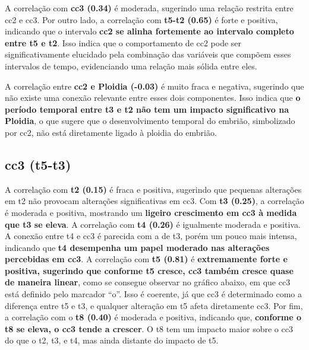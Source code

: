 A correlação com \textbf{cc3 (0.34)} é moderada, sugerindo uma relação restrita entre cc2 e cc3. Por outro lado, a correlação com \textbf{t5-t2 (0.65)} é forte e positiva, indicando que o intervalo \textbf{cc2 se alinha fortemente ao intervalo completo entre t5 e t2}. Isso indica que o comportamento de cc2 pode ser significativamente elucidado pela combinação das variáveis que compõem esses intervalos de tempo, evidenciando uma relação mais sólida entre eles.

A correlação entre \textbf{cc2 e Ploidia (-0.03)} é muito fraca e negativa, sugerindo que não existe uma conexão relevante entre esses dois componentes. Isso indica que \textbf{o período temporal entre t3 e t2 não tem um impacto significativo na Ploidia}, o que sugere que o desenvolvimento temporal do embrião, simbolizado por cc2, não está diretamente ligado à ploidia do embrião.

\subsection*{cc3 (t5-t3)}
A correlação com \textbf{t2 (0.15)} é fraca e positiva, sugerindo que pequenas alterações em t2 não provocam alterações significativas em cc3. Com \textbf{t3 (0.25)}, a correlação é moderada e positiva, mostrando um \textbf{ligeiro crescimento em cc3 à medida que t3 se eleva}. A correlação com \textbf{t4 (0.26)} é igualmente moderada e positiva. A conexão entre t4 e cc3 é parecida com a de t3, porém um pouco mais intensa, indicando que \textbf{t4 desempenha um papel moderado nas alterações percebidas em cc3}. A correlação com \textbf{t5 (0.81)} é \textbf{extremamente forte e positiva, sugerindo que conforme t5 cresce, cc3 também cresce quase de maneira linear}, como se consegue observar no gráfico abaixo, em que cc3 está definido pelo marcador “o”. Isso é coerente, já que cc3 é determinado como a diferença entre t5 e t3, e qualquer alteração em t5 afeta diretamente cc3. Por fim, a correlação com o \textbf{t8 (0.40)} é moderada e positiva, indicando que, \textbf{conforme o t8 se eleva, o cc3 tende a crescer}. O t8 tem um impacto maior sobre o cc3 do que o t2, t3, e t4, mas ainda distante do impacto de t5.

